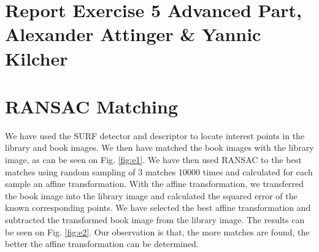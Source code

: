 \documentclass[11pt,a4paper]{article}
\begin{document}
\section*{Report Exercise 5 Advanced Part, Alexander Attinger \& Yannic Kilcher}

\section{RANSAC Matching}
We have used the SURF detector and descriptor to locate interest points in the library and book images.
We then have matched the book images with the library image, as can be seen on Fig. \ref{fig:e1}.
We have then used RANSAC to the best matches using random sampling of 3 matches 10000 times and calculated for each sample an affine transformation.
With the affine transformation, we transferred the book image into the library image and calculated the squared error of the known corresponding points.
We have selected the best affine transformation and subtracted the transformed book image from the library image. The results can be seen on Fig. \ref{fig:e2}.
Our observation is that, the more matches are found, the better the affine transformation can be determined.
\end{document}
